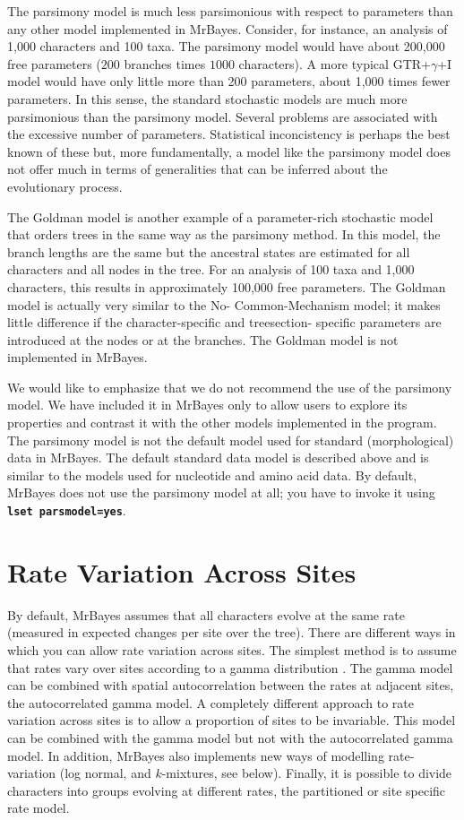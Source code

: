 \documentclass[12pt]{book}
\newcommand{\ttt}[1]{\texttt{#1}}
\newcommand{\tb}[1]{\ttt{\textbf{#1}}}
\begin{document}
The parsimony model is much less parsimonious with respect to parameters than any other model
implemented in MrBayes. Consider, for instance, an analysis of 1,000 characters and 100 taxa. The
parsimony model would have about 200,000 free parameters ($200$ branches times $1000$ characters).
A more typical GTR+$\gamma$+I model would have only little more than 200 parameters, about 1,000
times fewer parameters. In this sense, the standard stochastic models are much more parsimonious
than the parsimony model. Several problems are associated with the excessive number of parameters.
Statistical inconcistency is perhaps the best known of these but, more fundamentally, a model like
the parsimony model does not offer much in terms of generalities that can be inferred about the
evolutionary process.

The Goldman \citep{goldman93} model is another example of a parameter-rich stochastic model that
orders trees in the same way as the parsimony method. In this model, the branch lengths are the
same but the ancestral states are estimated for all characters and all nodes in the tree. For an
analysis of 100 taxa and 1,000 characters, this results in approximately 100,000 free parameters.
The Goldman model is actually very similar to the No- Common-Mechanism model; it makes little
difference if the character-specific and treesection- specific parameters are introduced at the
nodes or at the branches. The Goldman model is not implemented in MrBayes.

We would like to emphasize that we do not recommend the use of the parsimony model. We have
included it in MrBayes only to allow users to explore its properties and contrast it with the other
models implemented in the program. The parsimony model is not the default model used for standard
(morphological) data in MrBayes. The default standard data model is described above and is similar
to the models used for nucleotide and amino acid data. By default, MrBayes does not use the
parsimony model at all; you have to invoke it using \tb{lset parsmodel=yes}.

\section{Rate Variation Across Sites}
By default, MrBayes assumes that all characters evolve at the same rate (measured in expected
changes per site over the tree). There are different ways in which you can allow rate variation
across sites. The simplest method is to assume that rates vary over sites according to a gamma
distribution \citep{yang93}. The gamma model can be combined with spatial autocorrelation between
the rates at adjacent sites, the autocorrelated gamma model. A completely different approach to
rate variation across sites is to allow a proportion of sites to be invariable. This model can be
combined with the gamma model but not with the autocorrelated gamma model. In addition, MrBayes
also implements new ways of modelling rate-variation (log normal, and $k$-mixtures, see below).
Finally, it is possible to divide characters into groups evolving at different rates, the
partitioned or site specific rate model.
\end{document}
